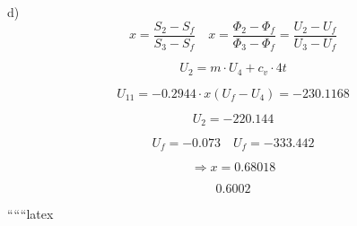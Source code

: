 d)
\begin{equation}
x = \frac{S_2 - S_f}{S_3 - S_f} \quad x = \frac{\Phi_2 - \Phi_f}{\Phi_3 - \Phi_f} = \frac{U_2 - U_f}{U_3 - U_f}
\end{equation}

\[
U_2 = m \cdot U_4 + c_v \cdot 4t
\]

\[
U_{11} = -0.2944 \cdot x(U_f - U_4) = -230.1168
\]

\[
U_2 = -220.144
\]

\[
U_f = -0.073 \quad U_f = -333.442
\]

\[
\Rightarrow x = 0.68018
\]

\[
0.6002
\]

``````latex